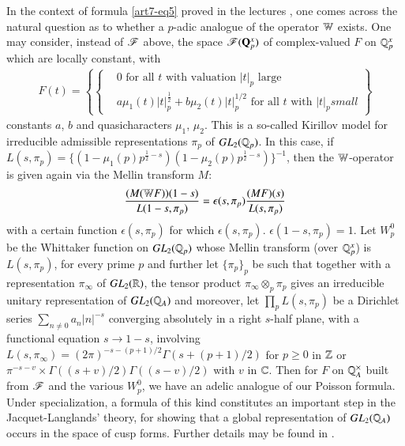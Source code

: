 In the context of formula \eqref{art7-eq5} proved in the lectures \cite{art7-I}, one comes across the natural question as to whether a $p$-adic analogue of the operator $\mathbb{W}$ exists. One may consider, instead of $\mathscr{F}$ above, the space $\mathscr{F} (\mathbf{Q}^x_p)$ of complex-valued $F$ on $\mathbb{Q}^x_p$ which are locally constant, with 
\begin{align*}
F(t) = 
\left\{ 
\begin{cases}
& \text{0 for all  $t$ with valuation $|t|_p$ large}\\
& a \mu_1 (t) |t|^{\frac{1}{2}}_p + b \mu_2 (t) |t|^{1/2}_p \text{ for all } t \text{ with } |t|_p small 
\end{cases}
\right\} \label{art7-eq8}
\end{align*}
constants $a$, $b$ and quasicharacters $\mu_1$, $\mu_2$. This is a so-called Kirillov model for irreducible admissible representations $\pi_p$ of $GL_2 (\mathbb{Q}_p)$. In this case, if $L(s, \pi_p) = \{(1-\mu_1 (p)p^{\frac{1}{2}-s}) (1-\mu_2 (p) p^{\frac{1}{2} -s})\}^{-1}$, then the $\mathbb{W}$-operator is given again via the Mellin transform $M$:
\begin{equation}
\frac{(M (\mathbb{W} F)) (1-s)}{L(1-s, \pi_p)} =\epsilon (s, \pi_p) \frac{(MF) (s)}{L(s, \pi_p)} \label{art7-eq9}
\end{equation}
with a certain function $\epsilon (s, \pi_p)$ for which $\epsilon (s, \pi_p)$. $\epsilon (1-s ,\pi_p) =1$. Let $W^0_p$ be the Whittaker function on $GL_2 (\mathbb{Q}_p)$ whose Mellin transform (over $\mathbb{Q}^x_p$) is $L(s, \pi_p)$, for every prime $p$ and further let $\{\pi_p\}_p$ be such that together with a representation $\pi_\infty$ of $GL_2 (\mathbb{R})$, the tensor product $\pi_\infty \otimes_p \pi_p$ gives an irreducible unitary representation of $GL_2 (\mathbb{Q}_A)$ and moreover, let $\prod\limits_p L (s, \pi_p)$ be a Dirichlet series $\sum\limits_{n \neq 0} a_n |n|^{-s}$ converging absolutely in a right $s$-half plane, with a functional equation $s \to 1 -s$, involving $L(s, \pi_\infty) = (2 \pi)^{-s-(p+1)/2} \Gamma (s+(p+1)/2)$ for $p \geqslant 0$ in $\mathbb{Z}$ or $\pi^{-s - v } \times \Gamma ((s+v)/2) \Gamma ((s-v)/2)$ with $v$ in $\mathbb{C}$. Then for $F$ on $\mathbb{Q}^\times_A$ built from $\mathscr{F}$ and the various $W^0_p$, we have an adelic analogue of our Poisson formula. Under specialization, a formula of this kind constitutes an important step in the Jacquet-Langlands' theory, for showing that a global representation of $GL_2 (\mathbb{Q}_A)$ occurs in the space of cusp forms. Further details may be found in \cite{art7-R-R}.

